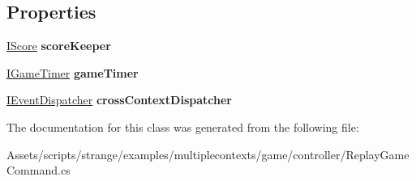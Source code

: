 \subsection*{Properties}
\begin{DoxyCompactItemize}
\item 
\hypertarget{classstrange_1_1examples_1_1multiplecontexts_1_1game_1_1_replay_game_command_a4a774c04107fc106db2c3a04c0214d06}{\hyperlink{interfacestrange_1_1examples_1_1multiplecontexts_1_1game_1_1_i_score}{I\-Score} {\bfseries score\-Keeper}}\label{classstrange_1_1examples_1_1multiplecontexts_1_1game_1_1_replay_game_command_a4a774c04107fc106db2c3a04c0214d06}

\item 
\hypertarget{classstrange_1_1examples_1_1multiplecontexts_1_1game_1_1_replay_game_command_ad67233f75a549af7be98076386b60cf1}{\hyperlink{interfacestrange_1_1examples_1_1multiplecontexts_1_1game_1_1_i_game_timer}{I\-Game\-Timer} {\bfseries game\-Timer}}\label{classstrange_1_1examples_1_1multiplecontexts_1_1game_1_1_replay_game_command_ad67233f75a549af7be98076386b60cf1}

\item 
\hypertarget{classstrange_1_1examples_1_1multiplecontexts_1_1game_1_1_replay_game_command_a55f79a6e399ae6c8f045a04c6eb75591}{\hyperlink{interfacestrange_1_1extensions_1_1dispatcher_1_1eventdispatcher_1_1api_1_1_i_event_dispatcher}{I\-Event\-Dispatcher} {\bfseries cross\-Context\-Dispatcher}}\label{classstrange_1_1examples_1_1multiplecontexts_1_1game_1_1_replay_game_command_a55f79a6e399ae6c8f045a04c6eb75591}

\end{DoxyCompactItemize}


The documentation for this class was generated from the following file\-:\begin{DoxyCompactItemize}
\item 
Assets/scripts/strange/examples/multiplecontexts/game/controller/Replay\-Game\-Command.\-cs\end{DoxyCompactItemize}
